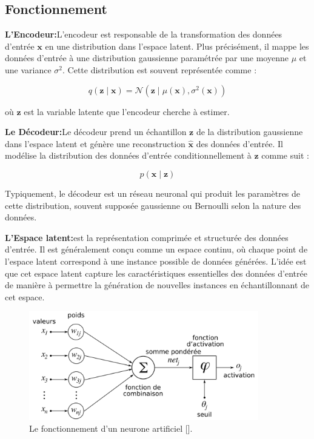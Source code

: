 \subsection{Fonctionnement}
\textbf{L'Encodeur:}L'encodeur est responsable de la transformation des données d'entrée \(\mathbf{x}\) en une distribution 
dans l'espace latent. Plus précisément, il mappe les données d'entrée à une distribution gaussienne paramétrée par 
une moyenne \(\mu\) et une variance \(\sigma^2\). Cette distribution est souvent représentée comme :


\begin{equation}
	q(\mathbf{z} \mid \mathbf{x}) = \mathcal{N}(\mathbf{z} \mid \mu(\mathbf{x}), \sigma^2(\mathbf{x}))
	\label{equ:couche}
\end{equation}


où \(\mathbf{z}\) est la variable latente que l'encodeur cherche à estimer.

\medskip

\textbf{Le Décodeur:}Le décodeur prend un échantillon \(\mathbf{z}\) de la distribution gaussienne dans
l'espace latent et génère une reconstruction \(\hat{\mathbf{x}}\) des données d'entrée. Il modélise la distribution
 des données d'entrée conditionnellement à \(\mathbf{z}\) comme suit :



\begin{equation}
	p(\mathbf{x} \mid \mathbf{z})
	\label{equ:couche}
\end{equation}


Typiquement, le décodeur est un réseau neuronal qui produit les paramètres de cette distribution, 
souvent supposée gaussienne ou Bernoulli selon la nature des données.

\medskip

\textbf{L'Espace latent:}est la représentation comprimée et structurée des données d'entrée. 
Il est généralement conçu comme un espace continu, où chaque point de l'espace latent correspond à une instance
possible de données générées. L'idée est que cet espace latent capture les caractéristiques essentielles 
des données d'entrée de manière à permettre 
la génération de nouvelles instances en échantillonnant de cet espace.

\begin{figure}[hbt!]
	\centering
	\includegraphics[width=10cm]{images_pfe/neurone.png}
	\caption{Le fonctionnement d'un neurone artificiel [\cite{mcculloch_pitts_1943_nervous_activity}].}
	\label{fig:fonctionnement-neurone}
\end{figure}


